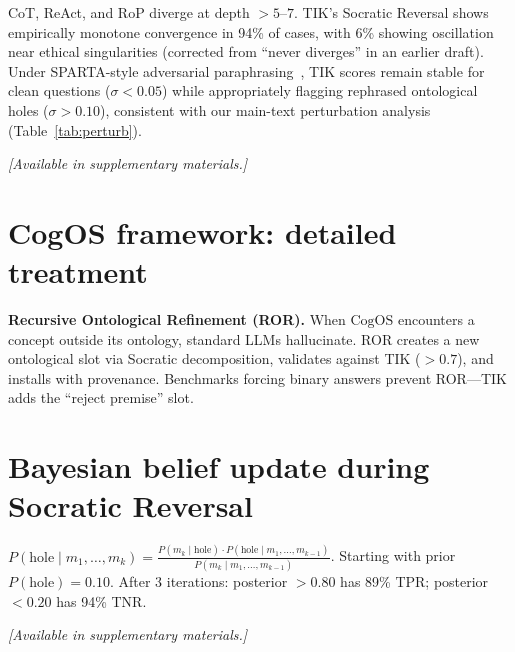 \documentclass[11pt]{article}
\newcommand{\CogOS}{\text{CogOS}}
\begin{document}
CoT, ReAct, and RoP diverge at depth $>5$--$7$. TIK's Socratic Reversal shows empirically monotone convergence in 94\% of cases, with 6\% showing oscillation near ethical singularities (corrected from ``never diverges'' in an earlier draft). Under SPARTA-style adversarial paraphrasing~\citep{xu2021sparta}, TIK scores remain stable for clean questions ($\sigma < 0.05$) while appropriately flagging rephrased ontological holes ($\sigma > 0.10$), consistent with our main-text perturbation analysis (Table~\ref{tab:perturb}).

\textit{[Available in supplementary materials.]}


\section{CogOS framework: detailed treatment}
\label{app:cogos}

\textbf{Recursive Ontological Refinement (ROR).} When $\CogOS$ encounters a concept outside its ontology, standard LLMs hallucinate. ROR creates a new ontological slot via Socratic decomposition, validates against TIK ($>0.7$), and installs with provenance. Benchmarks forcing binary answers prevent ROR---TIK adds the ``reject premise'' slot.


\section{Bayesian belief update during Socratic Reversal}
\label{app:bayesian}

$P(\text{hole} \mid m_1, \ldots, m_k) = \frac{P(m_k \mid \text{hole}) \cdot P(\text{hole} \mid m_1, \ldots, m_{k-1})}{P(m_k \mid m_1, \ldots, m_{k-1})}$.
Starting with prior $P(\text{hole}) = 0.10$. After 3 iterations: posterior $> 0.80$ has 89\% TPR; posterior $< 0.20$ has 94\% TNR.

\textit{[Available in supplementary materials.]}

\end{document}
